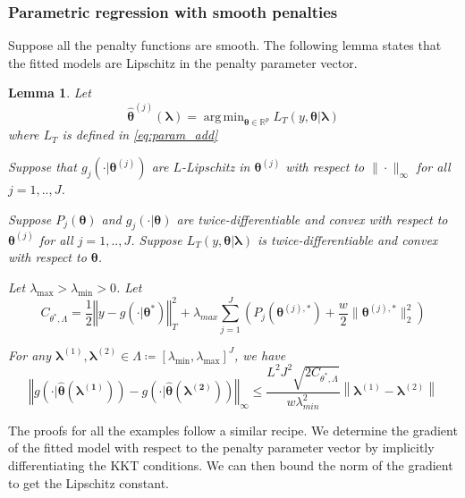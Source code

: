 \documentclass[12pt]{article}
\newtheorem{lemma}{Lemma}
\DeclareMathOperator*{\argmin}{arg\,min}
\begin{document}
\subsubsection{Parametric regression with smooth penalties}
Suppose all the penalty functions are smooth. The following lemma states that the fitted models are Lipschitz in the penalty parameter vector.
\begin{lemma}
	\label{lemma:param_add}
	Let 
	\begin{equation}
	\label{eq:param_add_estimator}
	\hat{\boldsymbol{\theta}}^{(j)}\left (\boldsymbol{\lambda}\right )  = 
	\argmin_{\boldsymbol{\theta} \in \mathbb{R}^p} L_T \left (y, \boldsymbol{\theta} | \boldsymbol{\lambda} \right )
	\end{equation}
	where $L_T$ is defined in \eqref{eq:param_add}
	
	Suppose that $g_j(\cdot| \boldsymbol{\theta}^{(j)})$ are $L$-Lipschitz in $\boldsymbol{\theta}^{(j)}$ with respect to $\| \cdot \|_\infty$ for all $j=1,..,J$.
	
	Suppose $P_j(\boldsymbol{\theta})$ and $g_j(\cdot| \boldsymbol{\theta})$ are twice-differentiable and convex with respect to $\boldsymbol{\theta}^{(j)}$ for all $j=1,..,J$. Suppose $L_T\left (y, \boldsymbol{\theta} | \boldsymbol{\lambda} \right )$ is twice-differentiable and convex with respect to $\boldsymbol{\theta}$.
	
	Let $\lambda_{\max} > \lambda_{\min} > 0 $. Let
	\begin{equation}
	C_{\theta^{*},\Lambda}=
	\frac{1}{2}\left\Vert y- g(\cdot|\boldsymbol{\theta}^{*})\right\Vert _{T}^{2}
	+\lambda_{max}\sum_{j=1}^{J}\left(P_{j}(\boldsymbol{\theta}^{(j),*})+\frac{w}{2}\|\boldsymbol{\theta}^{(j),*}\|_{2}^{2}\right)
	\end{equation}
	
	For any $\boldsymbol{\lambda}^{(1)}, \boldsymbol{\lambda}^{(2)} \in \Lambda \coloneqq \left [ \lambda_{\min}, \lambda_{\max} \right ]^J$, we have
	\begin{equation}
	\label{eq:param_add_lipschitz}
	\left\Vert g\left(\cdot|\hat{\boldsymbol{\theta}}(\boldsymbol{\lambda^{(1)}})\right)-g\left(\cdot|\hat{\boldsymbol{\theta}}(\boldsymbol{\lambda^{(2)}})\right)\right\Vert _{\infty}
	\le
	\frac{L^{2}J^{2}\sqrt{2C_{\theta^{*},\Lambda}}}{w\lambda_{min}^{2}}
	\left \|\boldsymbol{\lambda}^{(1)}-\boldsymbol{\lambda}^{(2)} \right \|
	\end{equation}
\end{lemma}

The proofs for all the examples follow a similar recipe. We determine the gradient of the fitted model with respect to the penalty parameter vector by implicitly differentiating the KKT conditions. We can then bound the norm of the gradient to get the Lipschitz constant.
\end{document}
